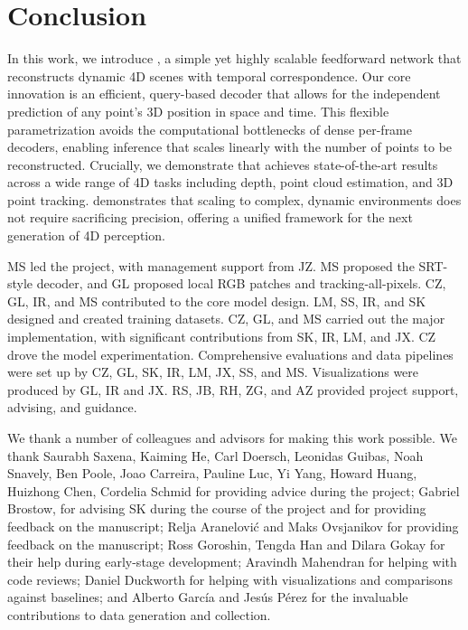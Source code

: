 \section{Conclusion}
\label{sec:conclusion}

In this work, we introduce \name, a simple yet highly scalable feedforward network that reconstructs dynamic 4D scenes with temporal correspondence.
Our core innovation is an efficient, query-based decoder that allows for the independent prediction of any point's 3D position in space and time.
This flexible parametrization avoids the computational bottlenecks of dense per-frame decoders, enabling inference that scales linearly with the number of points to be reconstructed.
Crucially, we demonstrate that \name achieves state-of-the-art results across a wide range of 4D tasks including depth,
point cloud estimation, and 3D point tracking.
\name demonstrates that scaling to complex, dynamic environments does not require sacrificing precision, offering a unified framework for the next generation of 4D perception.



MS led the project, with management support from JZ. MS proposed the SRT-style decoder, and GL proposed local RGB patches and tracking-all-pixels. CZ, GL, IR, and MS contributed to the core model design. LM, SS, IR, and SK designed and created training datasets. CZ, GL, and MS carried out the major implementation, with significant contributions from SK, IR, LM, and JX. CZ drove the model experimentation. Comprehensive evaluations and data pipelines were set up by CZ, GL, SK, IR, LM, JX, SS, and MS. Visualizations were produced by GL, IR and JX. RS, JB, RH, ZG, and AZ provided project support, advising, and guidance.

\noindent We thank a number of colleagues and advisors for making this work possible. We thank Saurabh Saxena, Kaiming He, Carl Doersch, Leonidas Guibas, Noah Snavely, Ben Poole, Joao Carreira, Pauline Luc, Yi Yang,  Howard Huang, Huizhong Chen, Cordelia Schmid for providing advice during the project; Gabriel Brostow, for advising SK during the course of the project and for providing feedback on the manuscript; Relja \mbox{Aran\dj elović} and Maks Ovsjanikov for providing feedback on the manuscript; Ross Goroshin, Tengda Han and Dilara Gokay for their help during early-stage development; Aravindh Mahendran for helping with code reviews; Daniel Duckworth for helping with visualizations and comparisons against baselines; and Alberto García and Jesús Pérez for the invaluable contributions to data generation and collection.
